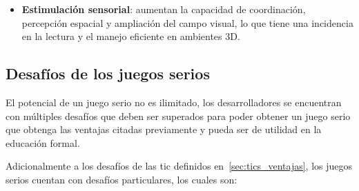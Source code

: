 \begin{itemize}
\item \textbf{Estimulación sensorial}: aumentan la capacidad de coordinación,
    percepción espacial y ampliación del campo visual, lo que tiene una
    incidencia en la lectura y el manejo eficiente en ambientes
    3D\cite{guenaga2013serious}. 

\end{itemize}


\subsection{Desafíos de los juegos serios}

El potencial de un juego serio no es ilimitado, los desarrolladores se
encuentran con múltiples desafíos que deben ser superados para poder obtener un
juego serio que obtenga las ventajas citadas previamente y pueda ser de utilidad
en la educación formal.

Adicionalmente a los desafíos de las \Gls{tic} definidos
en~\ref{sec:tics_ventajas}, los juegos serios cuentan con desafíos particulares,
los cuales son:

